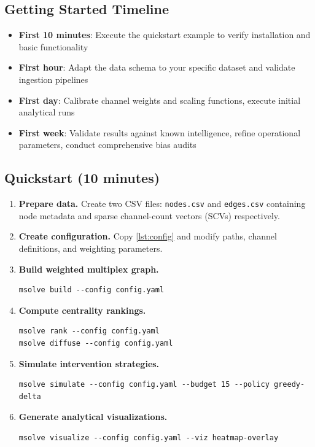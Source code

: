 \documentclass[12pt]{article}
\theoremstyle{plain}
\begin{document}
\subsection{Getting Started Timeline}
\label{subsec:getting-started-timeline}
\begin{itemize}\itemsep0.2em
  \item \textbf{First 10 minutes}: Execute the quickstart example to verify installation and basic functionality
  \item \textbf{First hour}: Adapt the data schema to your specific dataset and validate ingestion pipelines
  \item \textbf{First day}: Calibrate channel weights and scaling functions, execute initial analytical runs
  \item \textbf{First week}: Validate results against known intelligence, refine operational parameters, conduct comprehensive bias audits
\end{itemize}

\subsection{Quickstart (10 minutes)}
\begin{enumerate}
  \item \textbf{Prepare data.} Create two CSV files: \texttt{nodes.csv} and \texttt{edges.csv} containing node metadata and sparse channel-count vectors (SCVs) respectively.
  \item \textbf{Create configuration.} Copy \autoref{lst:config} and modify paths, channel definitions, and weighting parameters.
  \item \textbf{Build weighted multiplex graph.}
\begin{verbatim}
msolve build --config config.yaml
\end{verbatim}
  \item \textbf{Compute centrality rankings.}
\begin{verbatim}
msolve rank --config config.yaml
msolve diffuse --config config.yaml
\end{verbatim}
  \item \textbf{Simulate intervention strategies.}
\begin{verbatim}
msolve simulate --config config.yaml --budget 15 --policy greedy-delta
\end{verbatim}
  \item \textbf{Generate analytical visualizations.}
\begin{verbatim}
msolve visualize --config config.yaml --viz heatmap-overlay
\end{verbatim}
\end{enumerate}
\end{document}
